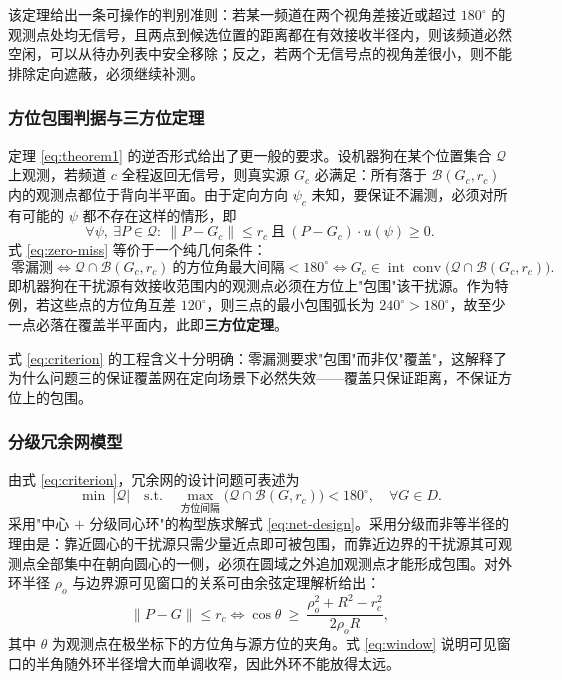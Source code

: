 \documentclass[12pt,a4paper]{ctexart}
\begin{document}
该定理给出一条可操作的判别准则：若某一频道在两个视角差接近或超过 $180^\circ$ 的观测点处均无信号，且两点到候选位置的距离都在有效接收半径内，则该频道必然空闲，可以从待办列表中安全移除；反之，若两个无信号点的视角差很小，则不能排除定向遮蔽，必须继续补测。

\subsubsection{方位包围判据与三方位定理}

定理 \eqref{eq:theorem1} 的逆否形式给出了更一般的要求。设机器狗在某个位置集合 $\mathcal Q$ 上观测，若频道 $c$ 全程返回无信号，则真实源 $G_c$ 必满足：所有落于 $\mathcal B(G_c,r_c)$ 内的观测点都位于背向半平面。由于定向方向 $\psi_c$ 未知，要保证不漏测，必须对所有可能的 $\psi$ 都不存在这样的情形，即
\begin{equation}
\forall\psi,\ \exists P\in\mathcal Q:\ \lVert P-G_c\rVert\le r_c\ \text{且}\ (P-G_c)\cdot u(\psi)\ge0 .
\label{eq:zero-miss}
\end{equation}
式 \eqref{eq:zero-miss} 等价于一个纯几何条件：
\begin{equation}
\boxed{\ \text{零漏测}\iff
\mathcal Q\cap\mathcal B(G_c,r_c)\ \text{的方位角最大间隔}<180^\circ
\iff G_c\in\operatorname{int}\operatorname{conv}\bigl(\mathcal Q\cap\mathcal B(G_c,r_c)\bigr).\ }
\label{eq:criterion}
\end{equation}
即机器狗在干扰源有效接收范围内的观测点必须在方位上"包围"该干扰源。作为特例，若这些点的方位角互差 $120^\circ$，则三点的最小包围弧长为 $240^\circ>180^\circ$，故至少一点必落在覆盖半平面内，此即\textbf{三方位定理}。

式 \eqref{eq:criterion} 的工程含义十分明确：零漏测要求"包围"而非仅"覆盖"，这解释了为什么问题三的保证覆盖网在定向场景下必然失效——覆盖只保证距离，不保证方位上的包围。

\subsubsection{分级冗余网模型}

由式 \eqref{eq:criterion}，冗余网的设计问题可表述为
\begin{equation}
\min\ \lvert\mathcal Q\rvert
\quad\text{s.t.}\quad
\max_{\text{方位间隔}}\bigl(\mathcal Q\cap\mathcal B(G,r_c)\bigr)<180^\circ,
\quad\forall G\in D .
\label{eq:net-design}
\end{equation}
采用"中心 $+$ 分级同心环"的构型族求解式 \eqref{eq:net-design}。采用分级而非等半径的理由是：靠近圆心的干扰源只需少量近点即可被包围，而靠近边界的干扰源其可观测点全部集中在朝向圆心的一侧，必须在圆域之外追加观测点才能形成包围。对外环半径 $\rho_o$ 与边界源可见窗口的关系可由余弦定理解析给出：
\begin{equation}
\lVert P-G\rVert\le r_c
\iff
\cos\theta\ \ge\ \frac{\rho_o^2+R^2-r_c^2}{2\rho_o R},
\label{eq:window}
\end{equation}
其中 $\theta$ 为观测点在极坐标下的方位角与源方位的夹角。式 \eqref{eq:window} 说明可见窗口的半角随外环半径增大而单调收窄，因此外环不能放得太远。
\end{document}
